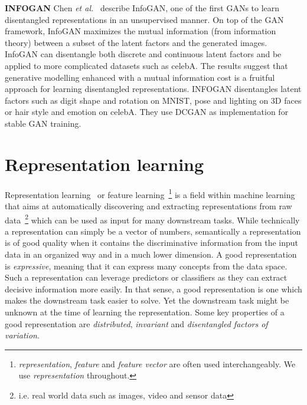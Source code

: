\documentclass[a4paper,12pt]{report}
\begin{document}
\par\textbf{INFOGAN} Chen \textit{et al.}~\cite{InfoGAN} describe InfoGAN, one of the first GANs to learn disentangled representations in an unsupervised manner. On top of the GAN framework, InfoGAN maximizes the mutual information (from information theory) between a subset of the latent factors and the generated images. InfoGAN can disentangle both discrete and continuous latent factors and be applied to more complicated datasets such as celebA. The results suggest that generative modelling enhanced with a mutual information cost is a fruitful approach for learning disentangled representations. INFOGAN disentangles latent factors such as digit shape and rotation on MNIST, pose and lighting on 3D faces or hair style and emotion on celebA. They use DCGAN as implementation for stable GAN training. 



\section{Representation learning}
Representation learning~\cite{ReprLearning} or feature learning~\footnote{\textit{representation}, \textit{feature} and \textit{feature vector} are often used interchangeably. We use \textit{representation} throughout.} is a field within machine learning that aims at automatically discovering and extracting representations from raw data~\footnote{i.e. real world data such as images, video and sensor data} which can be used as input for many downstream tasks. While technically a representation can simply be a vector of numbers, semantically a representation is of good quality when it contains the discriminative information from the input data in an organized way and in a much lower dimension. A good representation is \textit{expressive}, meaning that it can express many concepts from the data space. Such a representation can leverage predictors or classifiers as they can extract decisive information more easily. In that sense, a good representation is one which makes the downstream task easier to solve. Yet the downstream task might be unknown at the time of learning the representation. Some key properties of a good representation are \textit{distributed}, \textit{invariant} and \textit{disentangled factors of variation}.
\end{document}
